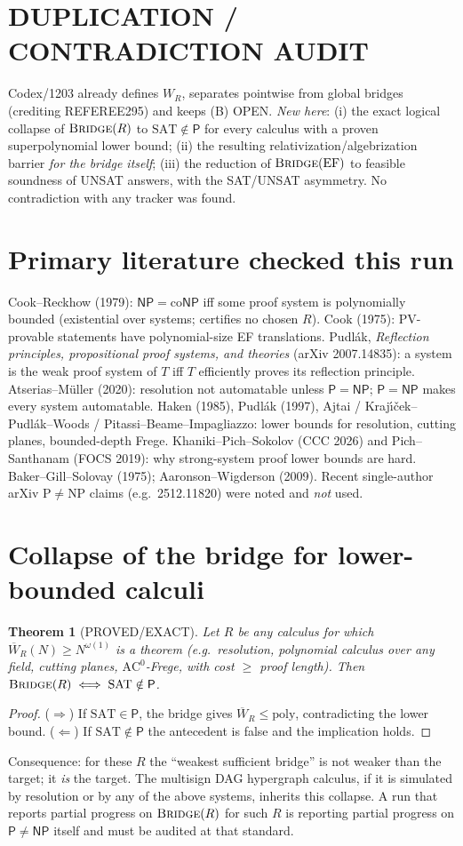 \documentclass[11pt]{article}
\newtheorem{theorem}{Theorem}
\newcommand{\SAT}{\mathrm{SAT}}
\newcommand{\Pclass}{\mathsf{P}}
\newcommand{\NP}{\mathsf{NP}}
\begin{document}
\section*{DUPLICATION / CONTRADICTION AUDIT}
Codex/1203 already defines $W_R$, separates pointwise from global bridges (crediting
REFEREE295) and keeps (B) OPEN. \emph{New here}: (i) the exact logical collapse of
$\textsc{Bridge}(R)$ to $\SAT\notin\Pclass$ for every calculus with a proven superpolynomial
lower bound; (ii) the resulting relativization/algebrization barrier \emph{for the bridge
itself}; (iii) the reduction of $\textsc{Bridge}(\mathrm{EF})$ to feasible soundness of
UNSAT answers, with the SAT/UNSAT asymmetry. No contradiction with any tracker was found.

\section*{Primary literature checked this run}
Cook--Reckhow (1979): $\NP=\mathrm{co}\NP$ iff some proof system is polynomially bounded
(existential over systems; certifies no chosen $R$). Cook (1975): PV-provable statements
have polynomial-size EF translations. Pudl\'ak, \emph{Reflection principles, propositional
proof systems, and theories} (arXiv 2007.14835): a system is the weak proof system of $T$
iff $T$ efficiently proves its reflection principle. Atserias--M\"uller (2020): resolution not
automatable unless $\Pclass=\NP$; $\Pclass=\NP$ makes every system automatable. Haken (1985),
Pudl\'ak (1997), Ajtai / Kraj\'\i\v{c}ek--Pudl\'ak--Woods / Pitassi--Beame--Impagliazzo: lower
bounds for resolution, cutting planes, bounded-depth Frege. Khaniki--Pich--Sokolov (CCC 2026)
and Pich--Santhanam (FOCS 2019): why strong-system proof lower bounds are hard. Baker--Gill--Solovay
(1975); Aaronson--Wigderson (2009). Recent single-author arXiv P$\neq$NP claims (e.g.\ 2512.11820)
were noted and \emph{not} used.

\section{Collapse of the bridge for lower-bounded calculi}
\begin{theorem}[PROVED/EXACT]\label{thm:collapse}
Let $R$ be any calculus for which $\overline W_R(N)\ge N^{\omega(1)}$ is a theorem
(e.g.\ resolution, polynomial calculus over any field, cutting planes, $\mathrm{AC}^0$-Frege,
with cost $\ge$ proof length). Then $\textsc{Bridge}(R)\iff \SAT\notin\Pclass$.
\end{theorem}
\begin{proof}
($\Rightarrow$) If $\SAT\in\Pclass$, the bridge gives $\overline W_R\le\mathrm{poly}$, contradicting the
lower bound. ($\Leftarrow$) If $\SAT\notin\Pclass$ the antecedent is false and the implication holds.
\end{proof}
Consequence: for these $R$ the ``weakest sufficient bridge'' is not weaker than the target;
it \emph{is} the target. The multisign DAG hypergraph calculus, if it is
simulated by resolution or by any of the above systems, inherits this collapse. A run that
reports partial progress on $\textsc{Bridge}(R)$ for such $R$ is reporting partial progress on
$\Pclass\neq\NP$ itself and must be audited at that standard.
\end{document}
